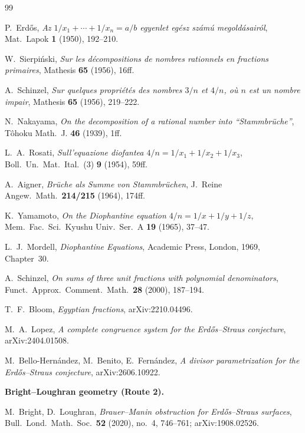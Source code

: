 \documentclass[11pt]{article}
\theoremstyle{plain}
\theoremstyle{definition}
\theoremstyle{remark}
\renewcommand{\_}{\textunderscore\allowbreak}
\begin{document}
\begin{thebibliography}{99}
\small

 P.~Erd\H{o}s, \emph{Az $1/x_1+\cdots+1/x_n=a/b$ egyenlet eg\'esz sz\'am\'u
megold\'asair\'ol}, Mat.\ Lapok \textbf{1} (1950), 192--210.

 W.~Sierpi\'nski, \emph{Sur les d\'ecompositions de nombres rationnels en
fractions primaires}, Mathesis \textbf{65} (1956), 16ff.

 A.~Schinzel, \emph{Sur quelques propri\'et\'es des nombres $3/n$ et $4/n$,
o\`u $n$ est un nombre impair}, Mathesis \textbf{65} (1956), 219--222.

 N.~Nakayama, \emph{On the decomposition of a rational number into
``Stammbr\"uche''}, T\^ohoku Math.\ J. \textbf{46} (1939), 1ff.

 L.~A.~Rosati, \emph{Sull'equazione diofantea $4/n=1/x_1+1/x_2+1/x_3$},
Boll.\ Un.\ Mat.\ Ital.\ (3) \textbf{9} (1954), 59ff.

 A.~Aigner, \emph{Br\"uche als Summe von Stammbr\"uchen}, J.\ Reine Angew.\
Math.\ \textbf{214/215} (1964), 174ff.

 K.~Yamamoto, \emph{On the Diophantine equation $4/n=1/x+1/y+1/z$}, Mem.\
Fac.\ Sci.\ Kyushu Univ.\ Ser.\ A \textbf{19} (1965), 37--47.

 L.~J.~Mordell, \emph{Diophantine Equations}, Academic Press, London, 1969,
Chapter~30.

 A.~Schinzel, \emph{On sums of three unit fractions with polynomial
denominators}, Funct.\ Approx.\ Comment.\ Math.\ \textbf{28} (2000), 187--194.

\bibitem{Bloom2022} T.~F.~Bloom, \emph{Egyptian fractions}, arXiv:2210.04496.

\bibitem{Lopez2024} M.~A.~Lopez, \emph{A complete congruence system for the Erd\H{o}s--Straus
conjecture}, arXiv:2404.01508.

 M.~Bello-Hern\'andez, M.~Benito, E.~Fern\'andez, \emph{A divisor
parametrization for the Erd\H{o}s--Straus conjecture}, arXiv:2606.10922.

\bigskip\noindent\textbf{Bright--Loughran geometry (Route 2).}

 M.~Bright, D.~Loughran, \emph{Brauer--Manin obstruction for
Erd\H{o}s--Straus surfaces}, Bull.\ Lond.\ Math.\ Soc.\ \textbf{52} (2020), no.~4, 746--761;
arXiv:1908.02526.


\end{thebibliography}
\end{document}
